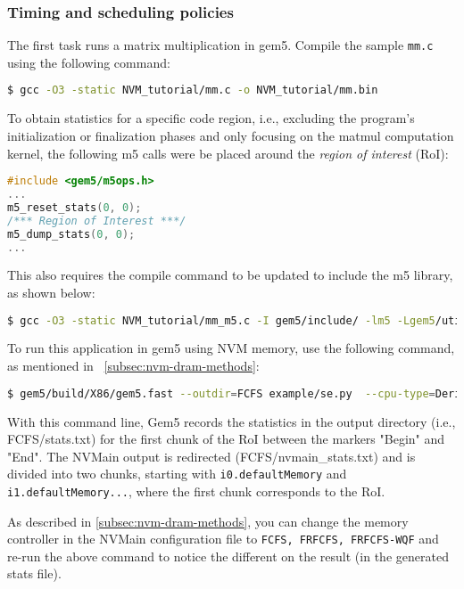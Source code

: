 \subsubsection*{Timing and scheduling policies}
\label{app:tudr:scheduling}
The first task runs a matrix multiplication in gem5. Compile the sample \texttt{mm.c} using the following command:
\begin{lstlisting}[language=bash]
$ gcc -O3 -static NVM_tutorial/mm.c -o NVM_tutorial/mm.bin
\end{lstlisting}

To obtain statistics for a specific code region, i.e., excluding the program's initialization or finalization phases and only focusing on the matmul computation kernel, the following m5 calls were be placed around the \emph{region of interest} (RoI):   

\begin{lstlisting}[language=C]
#include <gem5/m5ops.h>
...
m5_reset_stats(0, 0);
/*** Region of Interest ***/
m5_dump_stats(0, 0);
... 
\end{lstlisting}
This also requires the compile command to be updated to include the m5 library, as shown below:
\begin{lstlisting}[language=bash]
$ gcc -O3 -static NVM_tutorial/mm_m5.c -I gem5/include/ -lm5 -Lgem5/util/m5/build/x86/out -o NVM_tutorial/mm_m5.bin
\end{lstlisting}

To run this application in gem5 using NVM memory, use the following command, as mentioned in ~\cref{subsec:nvm-dram-methods}:

\begin{lstlisting}[language=bash]
$ gem5/build/X86/gem5.fast --outdir=FCFS example/se.py  --cpu-type=DerivO3CPU --caches --mem-type=NVMainMemory --nvmain- config=nvmain/Config/PCM_ISSCC_2012_4GB.config --cmd NVM_tutorial/mm_m5.bin &> FCFS/nvmain_stats.txt
\end{lstlisting}


With this command line, Gem5 records the statistics in the output directory (i.e., FCFS/stats.txt) for the first chunk of the RoI between the markers "Begin" and "End". The NVMain output is redirected (FCFS/nvmain\_stats.txt) and is divided into two chunks, starting with \texttt{i0.defaultMemory} and \texttt{i1.defaultMemory...}, where the first chunk corresponds to the RoI.  

As described in \cref{subsec:nvm-dram-methods}, you can change the memory controller in the NVMain configuration file to \texttt{FCFS, FRFCFS, FRFCFS-WQF} and re-run the above command to notice the different on the result (in the generated stats file). 
 
